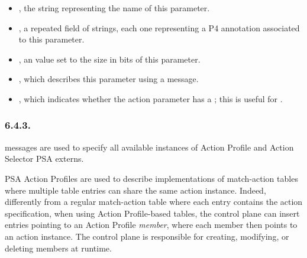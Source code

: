 \documentclass[11pt]{article}
\begin{document}
{\begin{itemize}
\begin{itemize}[noitemsep,topsep=\mdcompacttopsep]
\item{}, the string representing the name of this parameter.%

\item{}, a repeated field of strings, each one representing a P4
annotation associated to this parameter.%

\item{}, an  value set to the size in bits of this parameter.%

\item{}, which describes this parameter using a  message.%

\item{}, which indicates whether the action parameter has a
; this is useful for
.%
\end{itemize}%
\end{itemize}%

\subsubsection{6.4.3.\hspace*{0.5em}}\label{sec-p4info-action-profile}%

\noindent{} messages are used to specify all available instances of Action
Profile and Action Selector PSA externs.%

PSA Action Profiles are used to describe implementations of match-action tables
where multiple table entries can share the same action instance. Indeed,
differently from a regular match-action table where each entry contains the
action specification, when using Action Profile-based tables, the control plane
can insert entries pointing to an Action Profile \emph{member}, where each member
then points to an action instance. The control plane is responsible for
creating, modifying, or deleting members at runtime.%

}
\end{document}

